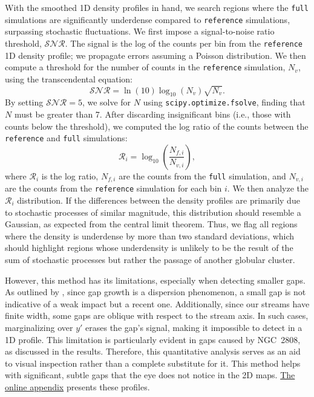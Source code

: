         With the smoothed 1D density profiles in hand, we search regions where the \texttt{full} simulations are significantly underdense compared to \texttt{reference} simulations, surpassing stochastic fluctuations. We first impose a signal-to-noise ratio threshold, $\mathcal{SNR}$. The signal is the log of the counts per bin from the \texttt{reference} 1D density profile; we propagate errors assuming a Poisson distribution. We then compute a threshold for the number of counts in the \texttt{reference} simulation, $N_v$, using the transcendental equation:
        \begin{equation}
            \mathcal{SNR} = \ln(10) \log_{10}\left(N_v\right) \sqrt{N_v}.
        \end{equation} \label{eq:density_threshold}
        By setting $\mathcal{SNR} = 5$, we solve for $N$ using \texttt{scipy.optimize.fsolve}, finding that $N$ must be greater than 7. After discarding insignificant bins (i.e., those with counts below the threshold), we computed the log ratio of the counts between the \texttt{reference} and \texttt{full} simulations:
        \begin{equation}
            \mathcal{R}_i = \log_{10}\left(\frac{N_{f,i}}{N_{v,i}}\right),
        \end{equation}
        where $\mathcal{R}_i$ is the log ratio, $N_{f,i}$ are the counts from the \texttt{full} simulation, and $N_{v,i}$ are the counts from the \texttt{reference} simulation for each bin $i$. We then analyze the $\mathcal{R}_i$ distribution. If the differences between the density profiles are primarily due to stochastic processes of similar magnitude, this distribution should resemble a Gaussian, as expected from the central limit theorem. Thus, we flag all regions where the density is underdense by more than two standard deviations, which should highlight regions whose underdensity is unlikely to be the result of the sum of stochastic processes but rather the passage of another globular cluster. 

        However, this method has its limitations, especially when detecting smaller gaps. As outlined by \citet{2015MNRAS.450.1136E}, since gap growth is a dispersion phenomenon, a small gap is not indicative of a weak impact but a recent one. Additionally, since our streams have finite width, some gaps are oblique with respect to the stream axis. In such cases, marginalizing over $y'$ erases the gap's signal, making it impossible to detect in a 1D profile. This limitation is particularly evident in gaps caused by NGC~2808, as discussed in the results. Therefore, this quantitative analysis serves as an aid to visual inspection rather than a complete substitute for it. This method helps with significant, subtle gaps that the eye does not notice in the 2D maps. \href{https://zenodo.org/records/15528089}{The online appendix} presents these profiles.

